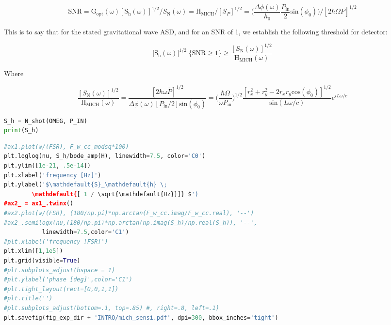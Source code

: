 \begin{equation}\mathrm{SNR} = \mathrm{G_{opt}(\omega)} [\mathrm{S}_{\mathrm{h}}(\omega)]^{1/2} / S_\mathrm{N}(\omega) = \mathrm{H}_\mathrm{MICH} / [S_P]^{1/2} = \bigg( \frac{\Delta \phi(\omega)}{h_0} \frac{P_\mathrm{in}}{2}\mathrm{sin}(\phi_0) \bigg) \bigg/ [2 \hbar \Omega \bar{P}]^{1/2}\end{equation}

\noindent This is to say that for the stated gravitational wave ASD, and for an
SNR of 1, we establish the following threshold for detector:

\begin{equation}\big[ \mathrm{S}_{\mathrm{h}}(\omega) \big]^{1/2} \; \{\mathrm{SNR}\geq1\} \geq \frac{ [S_\mathrm{N}(\omega)]^{1/2}}{\mathrm{H}_\mathrm{MICH}(\omega)}\end{equation}

\noindent Where

\begin{equation}\frac{ [S_\mathrm{N}(\omega)]^{1/2}}{\mathrm{H}_\mathrm{MICH}(\omega)} = \frac{[2 \hbar \omega \bar{P}]^{1/2}}{ \Delta \phi(\omega) [P_\mathrm{in} / 2]  \mathrm{sin}(\phi_0)} = \bigg( \frac{\hbar \Omega }{\omega P_\mathrm{in}} \bigg)^{1/2} \frac{[r_x^2 + r_y^2 -  2r_x r_y\mathrm{cos}(\phi_0)]^{1/2}}{\mathrm{sin}(L \omega / c)} e^{iL \omega / c}\end{equation}

\begin{spacing}{1.2} \begin{lstlisting}[frame=single, language=Python]
S_h = N_shot(OMEG, P_IN) 
print(S_h)
\end{lstlisting} \end{spacing}

\begin{spacing}{1.2} \begin{lstlisting}[frame=single, language=Python]
#ax1.plot(w/(FSR), F_w_cc_modsq*100)
plt.loglog(nu, S_h/bode_amp(H), linewidth=7.5, color='C0')
plt.ylim([1e-21, .5e-14])
plt.xlabel('frequency [Hz]')
plt.ylabel('$\mathdefault{S}_\mathdefault{h} \;  
	    \mathdefault{[ 1 / \sqrt{\mathdefault{Hz}}]} $')
#ax2_ = ax1_.twinx()
#ax2.plot(w/(FSR), (180/np.pi)*np.arctan(F_w_cc.imag/F_w_cc.real), '--')
#ax2_.semilogx(nu,(180/np.pi)*np.arctan(np.imag(S_h)/np.real(S_h)), '--', 
	       linewidth=7.5,color='C1')
#plt.xlabel('frequency [FSR]')
plt.xlim([1,1e5])
plt.grid(visible=True)
#plt.subplots_adjust(hspace = 1)
#plt.ylabel('phase [deg]',color='C1')
#plt.tight_layout(rect=[0,0,1,1])
#plt.title('')
#plt.subplots_adjust(bottom=.1, top=.85) #, right=.8, left=.1)
plt.savefig(fig_exp_dir + 'INTRO/mich_sensi.pdf', dpi=300, bbox_inches='tight')
\end{lstlisting} \end{spacing}

